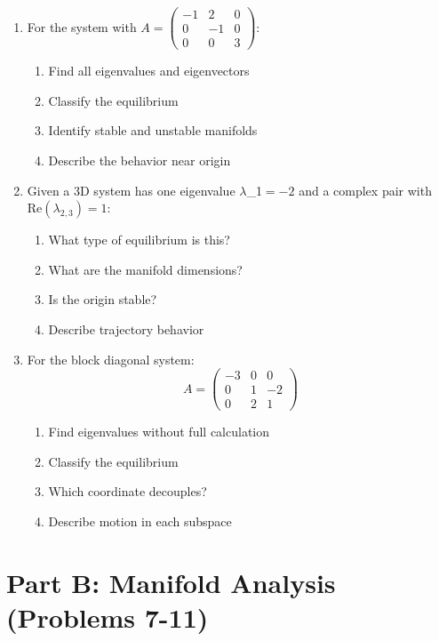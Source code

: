 \documentclass[12pt]{article}
\begin{document}
\begin{enumerate}
\item For the system with $A = \begin{pmatrix} -1 & 2 & 0 \\ 0 & -1 & 0 \\ 0 & 0 & 3 \end{pmatrix}$:
\begin{enumerate}[label=(\alph*)]
    \item Find all eigenvalues and eigenvectors
    \item Classify the equilibrium
    \item Identify stable and unstable manifolds
    \item Describe the behavior near origin
\end{enumerate}

\item Given a 3D system has one eigenvalue $\lambda$_{1}$ = -2$ and a complex pair with $\text{Re}(\lambda_{2,3}) = 1$:
\begin{enumerate}[label=(\alph*)]
    \item What type of equilibrium is this?
    \item What are the manifold dimensions?
    \item Is the origin stable?
    \item Describe trajectory behavior
\end{enumerate}

\item For the block diagonal system:
$$A = \begin{pmatrix} -3 & 0 & 0 \\ 0 & 1 & -2 \\ 0 & 2 & 1 \end{pmatrix}$$
\begin{enumerate}[label=(\alph*)]
    \item Find eigenvalues without full calculation
    \item Classify the equilibrium
    \item Which coordinate decouples?
    \item Describe motion in each subspace
\end{enumerate}
\end{enumerate}

\section*{Part B: Manifold Analysis (Problems 7-11)}
\end{document}
